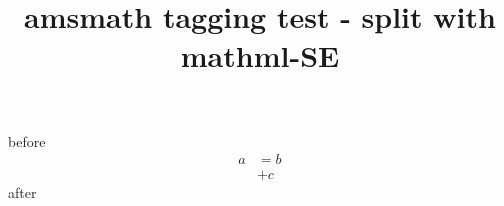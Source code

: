 \documentclass{article}
\title{amsmath tagging test - split with mathml-SE}
\begin{document}
before
\begin{equation}
\begin{split}
 a & =  b\\
   & +  c
\end{split} 
\end{equation}
after
\end{document}
